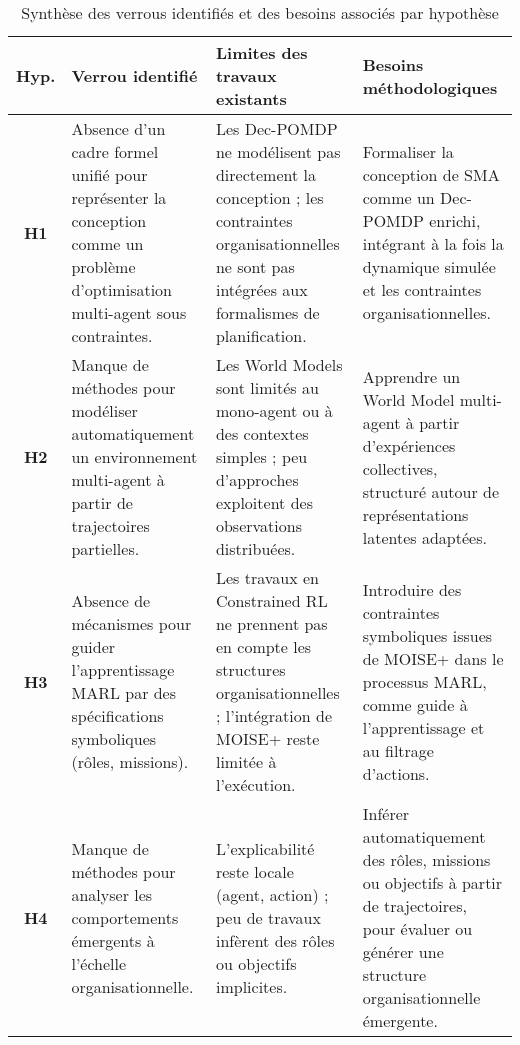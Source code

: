 \begin{table}[ht]
    \centering
    \caption{Synthèse des verrous identifiés et des besoins associés par hypothèse}
    \label{tab:verrous_hypotheses}
    \renewcommand{\arraystretch}{1.3}
    \begin{tabularx}{\textwidth}{cXXX}
    \hline
    \textbf{Hyp.} & \textbf{Verrou identifié} & \textbf{Limites des travaux existants} & \textbf{Besoins méthodologiques} \\
    \hline
    \textbf{H1} & Absence d'un cadre formel unifié pour représenter la conception comme un problème d'optimisation multi-agent sous contraintes. & Les Dec-POMDP ne modélisent pas directement la conception ; les contraintes organisationnelles ne sont pas intégrées aux formalismes de planification. & Formaliser la conception de SMA comme un Dec-POMDP enrichi, intégrant à la fois la dynamique simulée et les contraintes organisationnelles. \\

    \textbf{H2} & Manque de méthodes pour modéliser automatiquement un environnement multi-agent à partir de trajectoires partielles. & Les World Models sont limités au mono-agent ou à des contextes simples ; peu d'approches exploitent des observations distribuées. & Apprendre un World Model multi-agent à partir d'expériences collectives, structuré autour de représentations latentes adaptées. \\

    \textbf{H3} & Absence de mécanismes pour guider l'apprentissage MARL par des spécifications symboliques (rôles, missions). & Les travaux en Constrained RL ne prennent pas en compte les structures organisationnelles ; l'intégration de MOISE+ reste limitée à l'exécution. & Introduire des contraintes symboliques issues de MOISE+ dans le processus MARL, comme guide à l'apprentissage et au filtrage d'actions. \\

    \textbf{H4} & Manque de méthodes pour analyser les comportements émergents à l'échelle organisationnelle. & L'explicabilité reste locale (agent, action) ; peu de travaux infèrent des rôles ou objectifs implicites. & Inférer automatiquement des rôles, missions ou objectifs à partir de trajectoires, pour évaluer ou générer une structure organisationnelle émergente. \\
    \hline
    \end{tabularx}
    \end{table}
    
